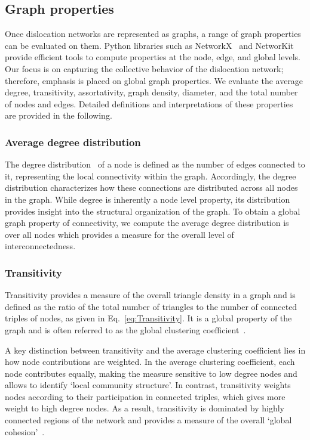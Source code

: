 \documentclass[pdflatex,sn-mathphys-num]{sn-jnl}%
\theoremstyle{thmstyleone}%
\theoremstyle{thmstyletwo}%
\theoremstyle{thmstylethree}%
\begin{document}
\subsection{Graph properties}\label{subsec:Graph_properties}

Once dislocation networks are represented as graphs, a range of graph properties can be evaluated on them.
Python libraries such as NetworkX~\cite{NetworkX} and NetworKit~\cite{staudt2015networkit} provide efficient tools to compute properties at the node, edge, and global levels.
Our focus is on capturing the collective behavior of the dislocation network; therefore, emphasis is placed on global graph properties.
We evaluate the average degree, transitivity, assortativity, graph density, diameter, and the total number of nodes and edges. Detailed definitions and interpretations of these properties are provided in the following.

\subsubsection*{Average degree distribution}\label{subsubsec:avg_DD}

The degree distribution~\cite{BarabasiNetworkScience, Newman2003} of a node is defined as the number of edges connected to it, representing the local connectivity within the graph. Accordingly, the degree distribution characterizes how these connections are distributed across all nodes in the graph.
While degree is inherently a node level property, its distribution provides insight into the structural organization of the graph.
To obtain a global graph property of connectivity, we compute the average degree distribution is over all nodes which provides a measure for the overall level of interconnectedness.

\subsubsection*{Transitivity}\label{subsubsec:transitivity}

Transitivity provides a measure of the overall triangle density in a graph and is defined as the ratio of the total number of triangles to the number of connected triples of nodes, as given in Eq.~\ref{eq:Transitivity}.
It is a global property of the graph and is often referred to as the global clustering coefficient~\cite{BarabasiNetworkScience}.

A key distinction between transitivity and the average clustering coefficient lies in how node contributions are weighted.
In the average clustering coefficient, each node contributes equally, making the measure sensitive to low degree nodes and allows to identify `local community structure'.
In contrast, transitivity weights nodes according to their participation in connected triples, which gives more weight to high degree nodes.
As a result, transitivity is dominated by highly connected regions of the network and provides a measure of the overall `global cohesion'~\cite{Newman2003, newman2010}.
\end{document}
